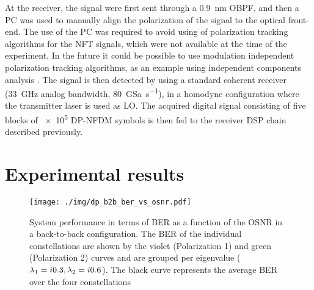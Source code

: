 At the receiver, the signal were first sent through a \SI{0.9}{\nm} \ac{OBPF}, and then a \ac{PC} was used to manually align
the polarization of the signal to the optical front-end. The use of the \ac{PC} was required to avoid using of polarization tracking algorithms for the \ac{NFT} signals, which were not available at the time of the experiment. In the future it could be possible to use modulation independent polarization tracking algorithms, as an example using independent components analysis \cite{nabavi2015demultiplexing}. The signal is then detected by using a standard coherent receiver (\SI{33}{\GHz} analog bandwidth, \SI{80}{GSa\per\s}), in a homodyne configuration where the transmitter laser is used as \ac{LO}. The acquired digital signal consisting of five blocks of \num{e5} \ac{DP-NFDM} symbols is then fed to the receiver \ac{DSP} chain described previously.



\section{Experimental results}\label{sec:experimental_results}
\label{experimental-results}

\begin{figure}[t]
  \centering
  \texttt{[image: ./img/dp\_b2b\_ber\_vs\_osnr.pdf]}
  \caption{System performance in terms of \ac{BER} as a function of the \acs{OSNR} in a back-to-back configuration. The \ac{BER} of the individual constellations are shown by the violet (Polarization 1) and green (Polarization 2) curves and are grouped per eigenvalue ($\eig[1] = \iunit0.3, \eig[2] = \iunit0.6$). The black curve represents the average \ac{BER} over the four constellations}
  \label{fig:b2bperfomance}
\end{figure}


